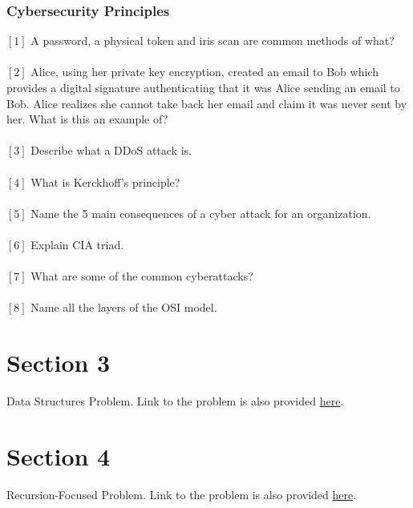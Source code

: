 \documentclass[letterpaper,12pt,addpoints]{exam}
\begin{document}
\subsubsection*{Cybersecurity Principles}
$[1]$ A password, a physical token and iris scan are common methods of what?\\
\\
$[2]$ Alice, using her private key encryption, created an email to Bob which provides a digital signature authenticating that it was Alice sending an email to Bob. Alice realizes she cannot take back her email and claim it was never sent by her. What is this an example of?\\
\\
$[3]$ Describe what a DDoS attack is. \\
\\
$[4]$ What is Kerckhoff’s principle?\\
\\
$[5]$ Name the 5 main consequences of a cyber attack for an organization.\\
\\
$[6]$ Explain CIA triad.\\
\\
$[7]$ What are some of the common cyberattacks?\\
\\
$[8]$ Name all the layers of the OSI model.

\pagebreak
\section*{Section 3}
Data Structures Problem. Link to the problem is also provided \href{https://www.hackerrank.com/challenges/detect-whether-a-linked-list-contains-a-cycle/problem?isFullScreen=true}{here}.

\pagebreak
\section*{Section 4}
Recursion-Focused Problem. Link to the problem is also provided \href{https://www.hackerrank.com/challenges/password-cracker/problem}{here}.
\end{document}
